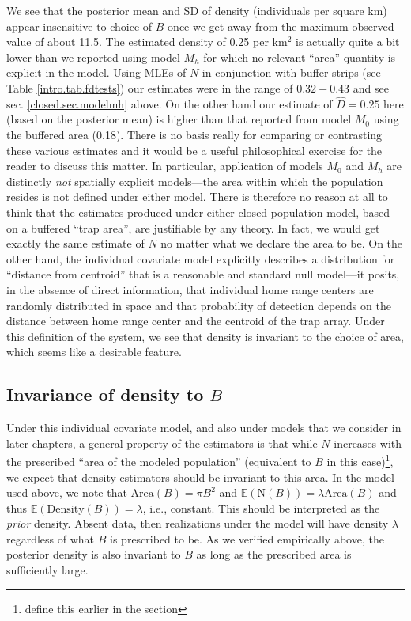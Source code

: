 We see that the posterior mean and SD of density (individuals per
square km) appear insensitive to choice of $B$ once we get away from the maximum observed value of about 11.5. The estimated
density of 0.25 per km$^2$ is actually quite a bit lower than we
reported using model $M_h$ for which no relevant ``area'' quantity is
explicit in the model.  Using MLEs of $N$ in conjunction with buffer
strips (see Table \ref{intro.tab.fdtests}) our estimates were in the
range of $0.32-0.43$ and see sec.  \ref{closed.sec.modelmh} above.  On
the other hand our estimate of $\hat{D} = 0.25$ here (based on the
posterior mean) is higher than that reported from model $M_0$ using
the buffered area (0.18). There is no basis really for comparing or
contrasting these various estimates and it would be a useful
philosophical exercise for the reader to discuss this matter. In
particular, application of models $M_0$ and $M_h$ are distinctly {\it
  not} spatially explicit models---the area within which the
population resides is not defined under either model. There is
therefore no reason at all to think that the estimates produced under
either closed population model, based on a buffered ``trap
area'', are justifiable by any theory. In fact, we would get exactly
the same estimate of $N$ no matter what we declare the area to be. On
the other hand, the individual covariate model explicitly describes a
distribution for ``distance from centroid'' that is a reasonable and
standard null model---it posits, in the absence of direct information,
that individual home range centers are randomly distributed in space
and that probability of detection depends on the distance between home
range center and the centroid of the trap array. Under this definition
of the system, we see that density is invariant to the choice of area,
which seems like a desirable feature.


\subsection{Invariance of density to $B$}

Under this individual covariate model, and also under models that we
consider in later chapters, a general property of the estimators is
that while $N$ increases with the prescribed ``area of the modeled
population'' (equivalent to $B$ in this case)\footnote{define this
  earlier in the section}, we expect that density estimators should be
invariant to this area. In the model used above, we note that
$\mbox{Area}(B) = \pi B^{2}$ and $\mathbb{E}(\mbox{N}(B)) = \lambda
\mbox{Area}(B)$ and thus $\mathbb{E}(\mbox{Density}(B)) = \lambda$,
i.e., constant. This should be interpreted as the {\it prior}
density. Absent data, then realizations under the model will have
density $\lambda$ regardless of what $B$ is prescribed to be.  As we
verified empirically above, the posterior density is also invariant to
$B$ as long as the prescribed area is sufficiently large.

